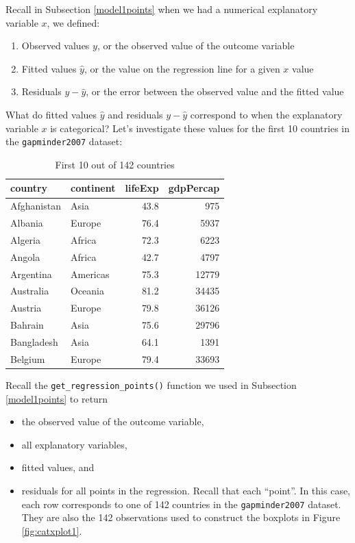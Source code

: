 \documentclass[12pt, krantz2,]{krantz}
\providecommand{\tightlist}{%
  \setlength{\itemsep}{0pt}\setlength{\parskip}{0pt}}
\begin{document}
Recall in Subsection \ref{model1points} when we had a numerical explanatory variable \(x\), we defined:

\begin{enumerate}
\def\labelenumi{\arabic{enumi}.}
\tightlist
\item
  Observed values \(y\), or the observed value of the outcome variable
\item
  Fitted values \(\widehat{y}\), or the value on the regression line for a given \(x\) value
\item
  Residuals \(y - \widehat{y}\), or the error between the observed value and the fitted value
\end{enumerate}

What do fitted values \(\widehat{y}\) and residuals \(y - \widehat{y}\) correspond to when the explanatory variable \(x\) is categorical? Let's investigate these values for the first 10 countries in the \texttt{gapminder2007} dataset:

\begin{table}[H]

\caption{\label{tab:unnamed-chunk-179}First 10 out of 142 countries}
\centering
\fontsize{10}{12}\selectfont
\begin{tabular}{llrr}
\toprule
country & continent & lifeExp & gdpPercap\\
\midrule
Afghanistan & Asia & 43.8 & 975\\
Albania & Europe & 76.4 & 5937\\
Algeria & Africa & 72.3 & 6223\\
Angola & Africa & 42.7 & 4797\\
Argentina & Americas & 75.3 & 12779\\
\addlinespace
Australia & Oceania & 81.2 & 34435\\
Austria & Europe & 79.8 & 36126\\
Bahrain & Asia & 75.6 & 29796\\
Bangladesh & Asia & 64.1 & 1391\\
Belgium & Europe & 79.4 & 33693\\
\bottomrule
\end{tabular}
\end{table}

Recall the \texttt{get\_regression\_points()} function we used in Subsection \ref{model1points} to return

\begin{itemize}
\tightlist
\item
  the observed value of the outcome variable,
\item
  all explanatory variables,
\item
  fitted values, and
\item
  residuals for all points in the regression. Recall that each ``point''. In this case, each row corresponds to one of 142 countries in the \texttt{gapminder2007} dataset. They are also the 142 observations used to construct the boxplots in Figure \ref{fig:catxplot1}.
\end{itemize}
\end{document}

